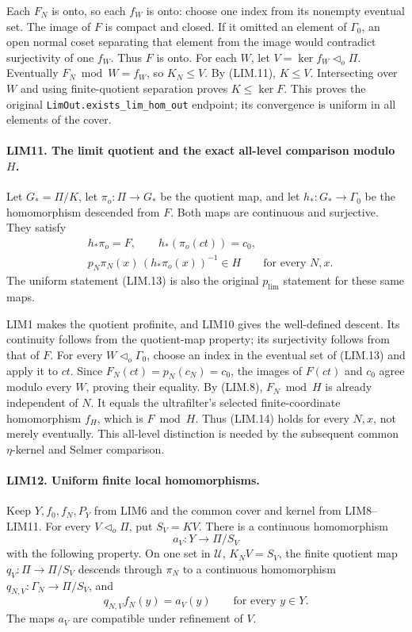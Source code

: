 Each \(F_N\) is onto, so each \(f_W\) is onto: choose one index
from its nonempty eventual set.  The image of \(F\) is compact
and closed.  If it omitted an element of \(\Gamma_0\), an open
normal coset separating that element from the image would
contradict surjectivity of one \(f_W\).  Thus \(F\) is onto.
For each \(W\), let \(V=\ker f_W\triangleleft_o\Pi\).
Eventually \(F_N\bmod W=f_W\), so \(K_N\le V\).
By (LIM.11), \(K\le V\).  Intersecting over \(W\) and using
finite-quotient separation proves \(K\le\ker F\).
This proves the original \texttt{LimOut.exists\_lim\_hom\_out}
endpoint; its convergence is uniform in all elements of the cover.

\paragraph{LIM11. The limit quotient and the exact all-level comparison modulo \(H\).}
\label{claim:LIM11}
Let \(G_* =\Pi/K\), let \(\pi_o:\Pi\to G_*\) be the quotient
map, and let \(h_*:G_*\to\Gamma_0\) be the homomorphism descended
from \(F\).  Both maps are continuous and surjective.  They satisfy
\[
 \begin{split}
 &h_*\pi_o=F,\qquad h_*(\pi_o(ct))=c_0,\\
 &p_N\pi_N(x)\,(h_*\pi_o(x))^{-1}\in H
       \qquad\text{for every }N,x.
 \end{split}
 \tag{LIM.14}
\]
The uniform statement (LIM.13) is also the original
\(p_{\mathrm{lim}}\) statement for these same maps.

LIM1 makes the quotient profinite, and LIM10 gives the well-defined
descent.  Its continuity follows from the quotient-map property;
its surjectivity follows from that of \(F\).
For every \(W\triangleleft_o\Gamma_0\), choose an index in the
eventual set of (LIM.13) and apply it to \(ct\).
Since \(F_N(ct)=p_N(c_N)=c_0\), the images of \(F(ct)\) and
\(c_0\) agree modulo every \(W\), proving their equality.
By (LIM.8), \(F_N\bmod H\) is already independent of \(N\).
It equals the ultrafilter's selected finite-coordinate homomorphism
\(f_H\), which is \(F\bmod H\).
Thus (LIM.14) holds for every \(N,x\), not merely eventually.
This all-level distinction is needed by the subsequent common
\(\eta\)-kernel and Selmer comparison.

\paragraph{LIM12. Uniform finite local homomorphisms.}
\label{claim:LIM12}
Keep \(Y,f_0,f_N,P_Y\) from LIM6 and the common cover and kernel
from LIM8--LIM11.  For every \(V\triangleleft_o\Pi\), put
\(S_V=KV\).  There is a continuous homomorphism
\[
 a_V:Y\longrightarrow\Pi/S_V
 \tag{LIM.15}
\]
with the following property.  On one set in \(\mathcal U\),
\(K_NV=S_V\), the finite quotient map \(q_V:\Pi\to\Pi/S_V\)
descends through \(\pi_N\) to a continuous homomorphism
\(q_{N,V}:\Gamma_N\to\Pi/S_V\), and
\[
 q_{N,V}f_N(y)=a_V(y)\qquad\text{for every }y\in Y.
 \tag{LIM.16}
\]
The maps \(a_V\) are compatible under refinement of \(V\).

